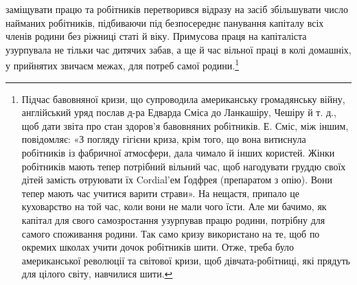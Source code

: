 \parcont{}  %
заміщувати працю та робітників перетворився відразу на засіб
збільшувати число найманих робітників, підбиваючи під безпосереднє
панування капіталу всіх членів родини без ріжниці статі
й віку. Примусова праця на капіталіста узурпувала не тільки час
дитячих забав, а ще й час вільної праці в колі домашніх, у прийнятих
звичаєм межах, для потреб самої родини.\footnote{
Підчас бавовняної кризи, що супроводила американську громадянську
війну, англійський уряд послав д-ра Едварда Сміса до Ланкашіру,
Чешіру й т. д., щоб дати звіта про стан здоров’я бавовняних робітників.
Е. Сміс, між іншим, повідомляє: «З погляду гігієни криза, крім
того, що вона витиснула робітників із фабричної атмосфери, дала чимало
й інших користей. Жінки робітників мають тепер потрібний вільний
час, щоб нагодувати груддю своїх дітей замість отруювати їх Cordial’ем
Ґодфрея (препаратом з опію). Вони тепер мають час учитися варити страви».
На нещастя, припало це куховарство на той час, коли вони не мали
чого їсти. Але ми бачимо, як капітал для свого самозростання узурпував
працю родини, потрібну для самого споживання родини. Так само кризу
використано на те, щоб по окремих школах учити дочок робітників шити.
Отже, треба було американської революції та світової кризи, щоб дівчата-робітниці,
які прядуть для цілого світу, навчилися шити.
}

